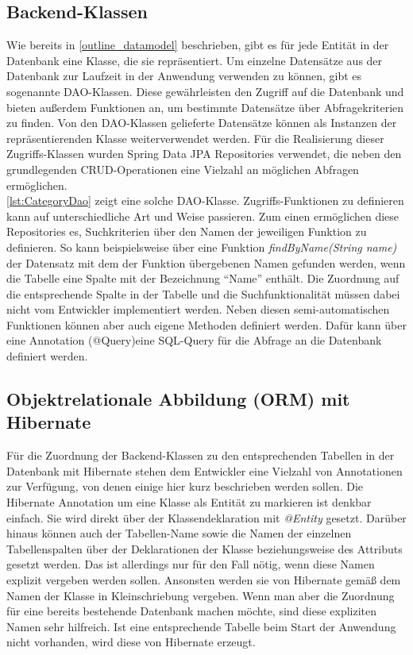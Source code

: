 \subsection{Backend-Klassen}
Wie bereits in \cref{outline_datamodel} beschrieben, gibt es für jede Entität in der Datenbank eine Klasse, die sie repräsentiert.
Um einzelne Datensätze aus der Datenbank zur Laufzeit in der Anwendung verwenden zu können, gibt es sogenannte \acs{DAO}-Klassen.
Diese gewährleisten den Zugriff auf die Datenbank und bieten außerdem Funktionen an, um bestimmte Datensätze über Abfragekriterien zu finden.
Von den \acs{DAO}-Klassen gelieferte Datensätze können als Instanzen der repräsentierenden Klasse weiterverwendet werden.
Für die Realisierung dieser Zugriffs-Klassen wurden Spring Data \acs{JPA} Repositories verwendet, die neben den grundlegenden \acs{CRUD}-Operationen eine Vielzahl an möglichen Abfragen ermöglichen.
\\


\cref{lst:CategoryDao} zeigt eine solche \acs{DAO}-Klasse.
Zugriffs-Funktionen zu definieren kann auf unterschiedliche Art und Weise passieren. Zum einen ermöglichen diese Repositories es, Suchkriterien über den Namen der jeweiligen Funktion zu definieren.
So kann beispielsweise über eine Funktion \textit{findByName(String name)} der Datensatz mit dem der Funktion übergebenen Namen gefunden werden, wenn die Tabelle eine Spalte mit der Bezeichnung \enquote{Name} enthält.
Die Zuordnung auf die entsprechende Spalte in der Tabelle und die Suchfunktionalität müssen dabei nicht vom Entwickler implementiert werden.
Neben diesen semi-automatischen Funktionen können aber auch eigene Methoden definiert werden. Dafür kann über eine Annotation (@Query)eine \acs{SQL}-Query für die Abfrage an die Datenbank definiert werden.

\subsection{Objektrelationale Abbildung (\acs{ORM}) mit Hibernate}
Für die Zuordnung der Backend-Klassen zu den entsprechenden Tabellen in der Datenbank mit Hibernate stehen dem Entwickler eine Vielzahl von Annotationen zur Verfügung, von denen einige hier kurz beschrieben werden sollen.
Die Hibernate Annotation um eine Klasse als Entität zu markieren ist denkbar einfach. Sie wird direkt über der Klassendeklaration mit \textit{@Entity} gesetzt.
Darüber hinaus können auch der Tabellen-Name sowie die Namen der einzelnen Tabellenspalten über der Deklarationen der Klasse beziehungsweise des Attributs gesetzt werden.
Das ist allerdings nur für den Fall nötig, wenn diese Namen explizit vergeben werden sollen. Ansonsten werden sie von Hibernate gemäß dem Namen der Klasse in Kleinschriebung vergeben.
Wenn man aber die Zuordnung für eine bereits bestehende Datenbank machen möchte, sind diese expliziten Namen sehr hilfreich.
Ist eine entsprechende Tabelle beim Start der Anwendung nicht vorhanden, wird diese von Hibernate erzeugt.

